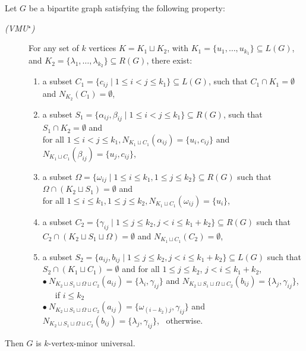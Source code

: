 \documentclass[a4paper,UKenglish,cleveref, autoref, thm-restate]{arxiv}
\newcommand{\ls}{\leqslant}
\begin{document}
\begin{lemma}\label{lemma:PstarCondition}
    Let $G$ be a bipartite graph satisfying the following property:
    \begin{description}
        \item[{\rm\em (VMU$^\star$)}] For any set of $k$ vertices $K=K_1 \sqcup K_2$, with $K_1 = \{u_1, \ldots , u_{k_1}\} \subseteq L(G)$, and $K_2=\{\lambda_1, \ldots, \lambda_{k_2} \} \subseteq R(G)$, there exist:
    \begin{enumerate}
        \item a subset $C_1 = \{c_{ij} \mid 1 \ls i < j \ls k_1\} \subseteq L(G)$, such that  $C_1 \cap K_1 = \emptyset$ and $N_{K_2}(C_1) = \emptyset$,
        
        \item a subset $S_1 = \{\alpha_{ij}, \beta_{ij} \mid 1 \ls i < j \ls k_1\} \subseteq R(G)$, such that $S_1 \cap K_2 = \emptyset$ and \\ for all $ 1 \ls i < j \ls k_1, N_{K_1 \sqcup C_1}(\alpha_{ij}) = \{u_i, c_{ij}\}$ and $N_{K_1 \sqcup C_1}(\beta_{ij}) = \{u_j, c_{ij}\}$,
        
        \item a subset $\Omega  = \{\omega_{ij} \mid 1 \ls i \ls k_1, 1 \ls j \ls k_2\} \subseteq R(G)$ such that $\Omega \cap(K_2 \sqcup S_1) = \emptyset$ and \\ for all $1 \ls i \ls k_1, 1 \ls j \ls k_2, N_{K_1 \sqcup C_1}(\omega_{ij}) = \{u_i\}$,
        
        \item a subset $C_{2}=\{\gamma_{ij} \mid 1 \ls j \ls k_2, j < i \ls k_1 + k_2 \} \subseteq R(G)$ such that $C_2 \cap (K_2 \sqcup S_1 \sqcup \Omega) = \emptyset$ and $N_{K_1 \sqcup C_1}(C_2)=\emptyset$,
        \item a subset $S_2= \{a_{ij}, b_{ij} \mid 1 \ls j \ls k_2, j < i \ls k_1 + k_2  \} \subseteq L(G)$ such that $S_2 \cap (K_1 \sqcup C_1) = \emptyset$ and for all $1 \ls j \ls k_2$, $j < i \ls k_1 + k_2$, \\
        $\bullet\ N_{K_2 \sqcup S_1 \sqcup \Omega \sqcup C_2}(a_{ij}) = \{\lambda_i, \gamma_{ij}\}$ and $N_{K_2 \sqcup S_1 \sqcup \Omega \sqcup C_2}(b_{ij}) = \{\lambda_j, \gamma_{ij}\}$, \qquad\ \ \ if $i \ls k_2$ \\
        $\bullet\ N_{K_2 \sqcup S_1 \sqcup \Omega \sqcup C_2}(a_{ij}) = \{\omega_{(i-k_2)j}, \gamma_{ij}\}$ and  $N_{K_2 \sqcup S_1 \sqcup \Omega \sqcup C_2}(b_{ij}) = \{\lambda_j, \gamma_{ij}\}$, \ otherwise.
    \end{enumerate}
    \end{description}
    Then $G$ is $k$-vertex-minor universal.
\end{lemma}
\end{document}
